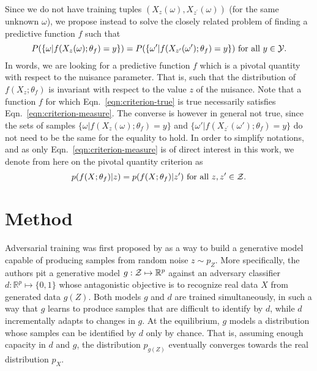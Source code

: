 \documentclass{article}
\theoremstyle{plain}
\begin{document}
Since we do not have training tuples $(X_{z}(\omega),
X_{z^\prime}(\omega))$ (for the same unknown $\omega$), we propose instead to
solve the closely related problem of finding a predictive function $f$ such that
\begin{equation}\label{eqn:criterion-measure}
    P(\{ \omega | f(X_{z}(\omega) ; \theta_f) = y \} ) = P( \{ \omega' | f(X_{z^\prime}(\omega') ; \theta_f) = y\}) \text{ for all $y \in {\cal Y}$}.
\end{equation}
In words, we are looking for a predictive function $f$ which is a pivotal
quantity \citep{degroot1986probability} with respect to the nuisance parameter.
That is, such that  the distribution of $f(X_z; \theta_f)$ is invariant
with respect to the value $z$ of the nuisance. Note that a function $f$ for which
Eqn.~\ref{eqn:criterion-true} is true necessarily satisfies
Eqn.~\ref{eqn:criterion-measure}. The converse is however in general not true, since the
sets of samples $\{ \omega | f(X_{z}(\omega); \theta_f) = y \}$ and $\{
\omega' | f(X_{z^\prime}(\omega'); \theta_f) = y \}$ do not need to be the same
for the equality to hold.
In order to simplify notations,
and as only Eqn.~\ref{eqn:criterion-measure} is
of direct interest in this work, we denote from here on
the pivotal quantity criterion as
\begin{equation}\label{eqn:criterion}
    p(f(X ; \theta_f) | z ) = p(f(X ; \theta_f) | z^\prime ) \text{ for all $z,z^\prime \in  {\cal Z}$.}
\end{equation}


\section{Method}
\label{sec:method}

Adversarial training was first proposed by \cite{goodfellow2014generative} as a
way to build a generative model capable of producing samples from random noise
$z \sim p_Z$. More specifically, the authors pit a generative model $g: {\cal Z}
\mapsto \mathbb{R}^p$ against an adversary classifier $d : \mathbb{R}^p \mapsto \{
0, 1\}$ whose antagonistic objective is to recognize real data $X$ from generated data $g(Z)$. Both
models $g$ and $d$ are trained simultaneously, in such a way that $g$ learns to
produce samples that are difficult to identify by $d$, while $d$ incrementally
adapts to changes in $g$. At the equilibrium, $g$ models a distribution whose
samples can be identified by $d$ only by chance. That is, assuming enough
capacity in $d$ and  $g$, the distribution $p_{g(Z)}$ eventually converges
towards the real distribution $p_X$.
\end{document}

